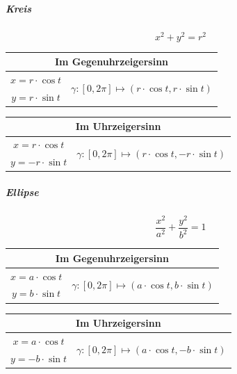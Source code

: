 \documentclass[a4paper,10pt]{article}
\begin{document}
\subparagraph{Kreis}
\[
    x^2 + y^2 = r^2
\]
\begin{table}[H]
    \centering
    \footnotesize
    \begin{tabular}{|c|c|}
        \hline
        \multicolumn{2}{|c|}{\textbf{Im Gegenuhrzeigersinn}} \\
        \hline
        $x = r \cdot \cos t$ & \multirow{2}{*}{\centering$\gamma : [0, 2\pi] \mapsto (r \cdot \cos t, r \cdot \sin t)$} \\
        $y = r \cdot \sin t$ & \\
        \hline
    \end{tabular}
\end{table}
\begin{table}[H]
    \centering
    \footnotesize
    \begin{tabular}{|c|c|}
        \hline
        \multicolumn{2}{|c|}{\textbf{Im Uhrzeigersinn}} \\
        \hline
        $x = r \cdot \cos t$ & \multirow{2}{*}{\centering$\gamma : [0, 2\pi] \mapsto (r \cdot \cos t, -r \cdot \sin t)$} \\
        $y = -r \cdot \sin t$ & \\
        \hline
    \end{tabular}
\end{table}

\subparagraph{Ellipse}
\[
    \frac{x^2}{a^2} + \frac{y^2}{b^2} = 1
\]
\begin{table}[H]
    \centering
    \footnotesize
    \begin{tabular}{|c|c|}
        \hline
        \multicolumn{2}{|c|}{\textbf{Im Gegenuhrzeigersinn}} \\
        \hline
        $x = a \cdot \cos t$ & \multirow{2}{*}{\centering$\gamma : [0, 2\pi] \mapsto (a \cdot \cos t, b \cdot \sin t)$} \\
        $y = b \cdot \sin t$ & \\
        \hline
    \end{tabular}
\end{table}
\begin{table}[H]
    \centering
    \footnotesize
    \begin{tabular}{|c|c|}
        \hline
        \multicolumn{2}{|c|}{\textbf{Im Uhrzeigersinn}} \\
        \hline
        $x = a \cdot \cos t$ & \multirow{2}{*}{\centering$\gamma : [0, 2\pi] \mapsto (a \cdot \cos t, -b \cdot \sin t)$} \\
        $y = -b \cdot \sin t$ & \\
        \hline
    \end{tabular}
\end{table}
\end{document}
